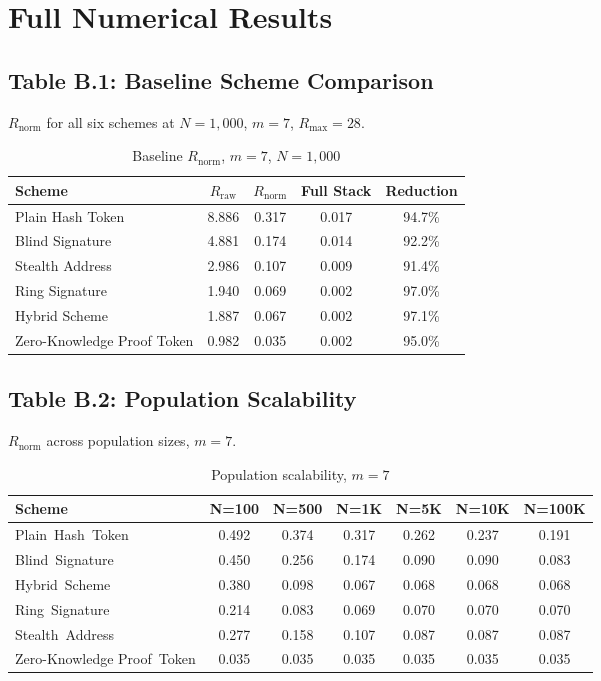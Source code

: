 \chapter{Full Numerical Results}
\label{app:b_tables}

\section*{Table B.1: Baseline Scheme Comparison}

$R_{\mathrm{norm}}$ for all six schemes at
$N = 1{,}000$, $m = 7$, $R_{\mathrm{max}} = 28$.

\begin{table}[H]
\centering
\caption{Baseline $R_{\mathrm{norm}}$, $m=7$, $N=1{,}000$}
\begin{tabular}{lcccc}
\toprule
\textbf{Scheme} &
\textbf{$R_{\mathrm{raw}}$} &
\textbf{$R_{\mathrm{norm}}$} &
\textbf{Full Stack} &
\textbf{Reduction}\\
\midrule
Plain Hash Token & 8.886 & 0.317 & 0.017 & 94.7\%\\
Blind Signature  & 4.881 & 0.174 & 0.014 & 92.2\%\\
Stealth Address  & 2.986 & 0.107 & 0.009 & 91.4\%\\
Ring Signature   & 1.940 & 0.069 & 0.002 & 97.0\%\\
Hybrid Scheme    & 1.887 & 0.067 & 0.002 & 97.1\%\\
Zero-Knowledge Proof Token        & 0.982 & 0.035 & 0.002 & 95.0\%\\
\bottomrule
\end{tabular}
\end{table}

\section*{Table B.2: Population Scalability}

$R_{\mathrm{norm}}$ across population sizes, $m = 7$.

\begin{table}[H]
\centering
\caption{Population scalability, $m=7$}
\small
\begin{tabular}{lcccccc}
\toprule
\textbf{Scheme} &
\textbf{N=100} & \textbf{N=500} & \textbf{N=1K} &
\textbf{N=5K} & \textbf{N=10K} & \textbf{N=100K}\\
\midrule
Plain~Hash~Token & 0.492 & 0.374 & 0.317 & 0.262 & 0.237 & 0.191\\
Blind~Signature  & 0.450 & 0.256 & 0.174 & 0.090 & 0.090 & 0.083\\
Hybrid~Scheme    & 0.380 & 0.098 & 0.067 & 0.068 & 0.068 & 0.068\\
Ring~Signature   & 0.214 & 0.083 & 0.069 & 0.070 & 0.070 & 0.070\\
Stealth~Address  & 0.277 & 0.158 & 0.107 & 0.087 & 0.087 & 0.087\\
Zero-Knowledge Proof~Token        & 0.035 & 0.035 & 0.035 & 0.035 & 0.035 & 0.035\\
\bottomrule
\end{tabular}
\end{table}

